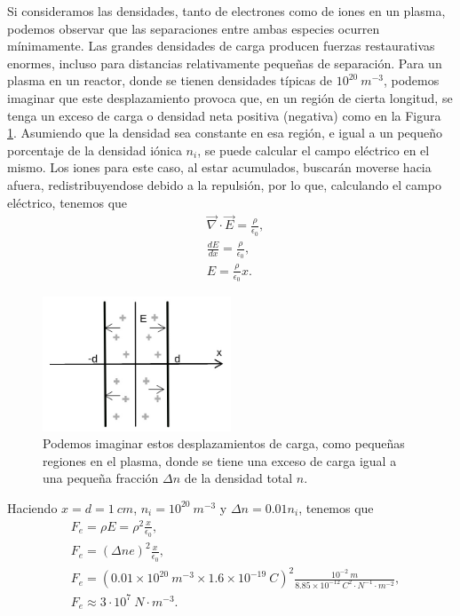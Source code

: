 \documentclass[../main.tex]{subfiles}
\begin{document}
    Si consideramos las densidades, tanto de electrones como de iones en un plasma, podemos observar que las separaciones entre ambas especies ocurren mínimamente. Las grandes densidades de carga producen fuerzas restaurativas enormes, incluso para distancias relativamente pequeñas de separación. Para un plasma en un reactor, donde se tienen densidades típicas de $10^{20} \ m^{-3}$, podemos imaginar que este desplazamiento provoca que, en un región de cierta longitud, se tenga un exceso de carga o densidad neta positiva (negativa) como en la Figura \ref{fig:figura2.1}. Asumiendo que la densidad sea constante en esa región, e igual a un pequeño porcentaje de la densidad iónica $n_i$, se puede calcular el campo eléctrico en el mismo. Los iones para este caso, al estar acumulados, buscarán moverse hacia afuera, redistribuyendose debido a la repulsión, por lo que, calculando el campo eléctrico, tenemos que
    \begin{align}
        &\vec{\nabla} \cdot \vec E = \frac{\rho}{\epsilon_0}, \\
        &\frac{dE}{dx} = \frac{\rho}{\epsilon_0}, \\
        &E = \frac{\rho}{\epsilon_0}x.
    \end{align}
    \begin{figure}[h] 
        \centering
        \includegraphics[width=0.5\textwidth]{Images/Debye_shielding.jpg}\caption{Podemos imaginar estos desplazamientos de carga, como pequeñas regiones en el plasma, donde se tiene una exceso de carga igual a una pequeña fracción $\Delta n$ de la densidad total $n.$ }
        \label{fig:figura2.1}
    \end{figure}
    
    Haciendo $x = d = 1 \ cm$, $n_i = 10^{20} \ m^{-3} $ y $\Delta n = 0.01 n_i$, tenemos que
    \begin{align} 
        &F_e = \rho E = \rho^2 \frac{x}{\epsilon_0}, \\
        &F_e = (\Delta ne)^2 \frac{x}{\epsilon_0}, \\
        &F_e = (0.01 \times 10^{20}\   m^{-3}\times 1.6 \times 10^{-19} \ C)^2 \frac{10^{-2} \ m}{8.85 \times 10^{-12} \ C^2\cdot N^{-1}\cdot m^{-2}}, \\
        &F_e \approx 3 \cdot 10^7 \ N \cdot m^{-3}.
    \end{align}
\end{document}
